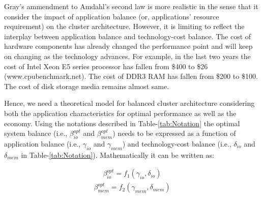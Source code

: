 \documentclass[journal]{IEEEtran}
\begin{document}
Gray's ammendment to Amdahl's second law is more realistic in the sense that it consider the impact of application balance (or, applications' resource requirement) on the cluster architecture.  However, it is limiting to reflect the interplay between application balance and technology-cost balance. The cost of hardware components has already changed the performance point and will keep on changing as the technology advances. For example, in the last two years the cost of Intel Xeon E5 series processor has fallen from \$400 to \$26 (www.cpubenchmark.net). The cost of DDR3 RAM has fallen from  \$200 to \$100. The cost of disk storage media remains almost same. 

Hence, we need a theoretical model for balanced cluster architecture considering both the application characteristics for optimal performance as well as the economy. Using the notations described in Table-\ref{tab:Notation} the optimal system balance (i.e., $\beta_{io}^{opt}$ and $\beta_{mem}^{opt}$) needs to be expressed as a function of application balance (i.e., $\gamma_{io}$ and $\gamma_{mem}$) and technology-cost balance (i.e., $\delta_{io}$ and $\delta_{mem}$ in Table-\ref{tab:Notation}). Mathematically it can be written as:

\begin{equation} \label{eqn:BalancedIONotation}
\begin{split}
\beta_{io}^{opt} = f_1(\gamma_{io}, \delta_{io})
\end{split}
\end{equation}
\begin{equation} \label{eqn:BalancedMemNotation}
\begin{split}
\beta_{mem}^{opt} = f_2(\gamma_{mem}, \delta_{mem})
\end{split}
\end{equation}
\end{document}
